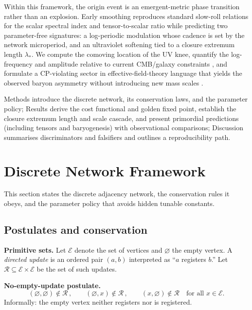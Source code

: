 \documentclass[11pt]{article}
\theoremstyle{definition}
\theoremstyle{remark}
\begin{document}
Within this framework, the origin event is an emergent-metric phase transition rather than an explosion. Early smoothing reproduces standard slow-roll relations for the scalar spectral index and tensor-to-scalar ratio while predicting two parameter-free signatures: a log-periodic modulation whose cadence is set by the network microperiod, and an ultraviolet softening tied to a closure extremum length \(\lambda_{\ast}\). We compute the comoving location of the UV knee, quantify the log-frequency and amplitude relative to current CMB/galaxy constraints \citep{Planck2018,Planck2018resonant,eBOSS2020features,ChenResonant2007}, and formulate a CP-violating sector in effective-field-theory language that yields the observed baryon asymmetry without introducing new mass scales \citep{CSBaryogenesis2004,BARYOGEN}.

Methods introduce the discrete network, its conservation laws, and the parameter policy; Results derive the cost functional and golden fixed point, establish the closure extremum length and scale cascade, and present primordial predictions (including tensors and baryogenesis) with observational comparisons; Discussion summarises discriminators and falsifiers and outlines a reproducibility path.

\section{Discrete Network Framework}

This section states the discrete adjacency network, the conservation rules it obeys, and the parameter policy that avoids hidden tunable constants.

\subsection{Postulates and conservation}

\textbf{Primitive sets.}
Let \(\mathcal{E}\) denote the set of vertices and \(\varnothing\) the empty vertex. A \emph{directed update} is an ordered pair \((a,b)\) interpreted as “\(a\) registers \(b\).” Let \(\mathcal{R}\subseteq \mathcal{E}\times\mathcal{E}\) be the set of such updates.

\medskip
\textbf{No-empty-update postulate.}
\begin{equation}
\label{eq:MP}
(\varnothing,\varnothing)\notin \mathcal{R}\,,
\qquad
(\varnothing,x)\notin \mathcal{R}\,,
\qquad
(x,\varnothing)\notin \mathcal{R}
\quad
\text{for all } x\in\mathcal{E}.
\end{equation}
Informally: the empty vertex neither registers nor is registered.
\end{document}

